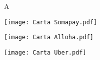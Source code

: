 \documentclass[10pt,a4paper,ragged2e,withhyper]{altacv}
\begin{document}
\begin{paracol}{2}
\begin{software}{A}  %
	
\end{software}

%

%

%

%

\end{paracol}

%		

\begin{paracol}{1}
	\texttt{[image: Carta Somapay.pdf]}\\
\end{paracol}

\begin{paracol}{1}
	\texttt{[image: Carta Alloha.pdf]}\\
\end{paracol}

\begin{paracol}{1}
	\texttt{[image: Carta Uber.pdf]}\\
\end{paracol}

\end{document}
